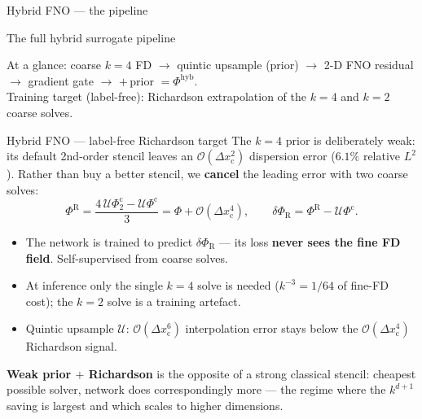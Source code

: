 \documentclass[aspectratio=169, 11pt]{beamer}
\newcommand{\Uop}{\mathcal{U}}
\begin{document}
\begin{frame}{Hybrid FNO --- the pipeline}
  \vfill
  \begin{center}
    {\Large The full hybrid surrogate pipeline}
    \par\medskip
    \par\bigskip
    {\footnotesize At a glance:\;
     coarse $k\!=\!4$ FD $\to$ quintic upsample (prior) $\to$ 2-D FNO residual
     $\to$ gradient gate $\to$ $+\,$prior $=\Phi^{\mathrm{hyb}}$.\\[2pt]
     Training target (label-free): Richardson extrapolation of the $k\!=\!4$ and $k\!=\!2$
     coarse solves.}
  \end{center}
  \vfill
\end{frame}

\begin{frame}{Hybrid FNO --- label-free Richardson target}
  The $k\!=\!4$ prior is deliberately weak: its default 2nd-order stencil leaves an
  $\mathcal{O}(\Delta x_{\mathrm c}^{2})$ dispersion error ($6.1\%$ relative $L^2$).
  Rather than buy a better stencil, we \textbf{cancel} the leading error with two
  coarse solves:
  \[
    \Phi^{\mathrm{R}}=\frac{4\,\Uop\Phi^{\mathrm{c}}_{2}-\Uop\Phi^{\mathrm{c}}}{3}
    =\Phi+\mathcal{O}(\Delta x_{\mathrm c}^{4}),
    \qquad
    \delta\Phi_{\mathrm{R}}=\Phi^{\mathrm{R}}-\Uop\Phi^{\mathrm{c}} .
  \]
  \begin{itemize}\small
    \item The network is trained to predict $\delta\Phi_{\mathrm{R}}$ ---
          its loss \textbf{never sees the fine FD field}. Self-supervised from coarse solves.
    \item At inference only the single $k\!=\!4$ solve is needed
          ($k^{-3}=1/64$ of fine-FD cost); the $k\!=\!2$ solve is a training artefact.
    \item Quintic upsample $\Uop$: $\mathcal{O}(\Delta x_{\mathrm c}^{6})$ interpolation
          error stays below the $\mathcal{O}(\Delta x_{\mathrm c}^{4})$ Richardson signal.
  \end{itemize}
  \medskip
  \footnotesize \textbf{Weak prior $+$ Richardson} is the opposite of a strong classical
  stencil: cheapest possible solver, network does correspondingly more --- the regime where
  the $k^{d+1}$ saving is largest and which scales to higher dimensions.
\end{frame}
\end{document}
